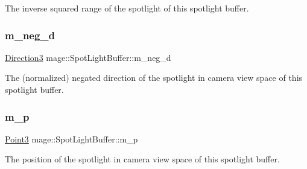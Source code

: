 The inverse squared range of the spotlight of this spotlight buffer. \hypertarget{structmage_1_1_spot_light_buffer_ae0baddd8256464e3cdf91a766f9bf143}{}\label{structmage_1_1_spot_light_buffer_ae0baddd8256464e3cdf91a766f9bf143} 
\subsubsection{\texorpdfstring{m\+\_\+neg\+\_\+d}{m\_neg\_d}}
{\footnotesize\ttfamily \hyperlink{structmage_1_1_direction3}{Direction3} mage\+::\+Spot\+Light\+Buffer\+::m\+\_\+neg\+\_\+d}

The (normalized) negated direction of the spotlight in camera view space of this spotlight buffer. \hypertarget{structmage_1_1_spot_light_buffer_a6cb32b6089b90aa937df99bb794884e3}{}\label{structmage_1_1_spot_light_buffer_a6cb32b6089b90aa937df99bb794884e3} 
\subsubsection{\texorpdfstring{m\+\_\+p}{m\_p}}
{\footnotesize\ttfamily \hyperlink{structmage_1_1_point3}{Point3} mage\+::\+Spot\+Light\+Buffer\+::m\+\_\+p}

The position of the spotlight in camera view space of this spotlight buffer. 